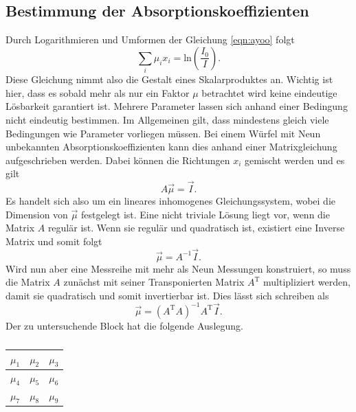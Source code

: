 \subsection{Bestimmung der Absorptionskoeffizienten}
Durch Logarithmieren und Umformen der Gleichung \eqref{eqn:ayoo} folgt
\begin{equation}
    \label{eqn:hierlol}
\sum_{i}^{} \mu_i x_i = \text{ln}\left(\frac{I_0}{I}\right).
\end{equation}
Diese Gleichung nimmt also die Gestalt eines Skalarproduktes an. Wichtig ist hier, dass es sobald mehr als nur ein Faktor $\mu$ betrachtet wird keine eindeutige Lösbarkeit garantiert ist. Mehrere Parameter lassen sich anhand einer Bedingung
nicht eindeutig bestimmen. Im Allgemeinen gilt, dass mindestens gleich viele Bedingungen wie Parameter vorliegen müssen. Bei einem Würfel mit Neun unbekannten Absorptionskoeffizienten kann dies anhand einer Matrixgleichung aufgeschrieben werden.
Dabei können die Richtungen $x_i$ gemischt werden und es gilt
\begin{equation*}
A \vec{\mu} = \vec{I}.
\end{equation*}
Es handelt sich also um ein lineares inhomogenes Gleichungssystem, wobei die Dimension von $\vec{\mu}$ festgelegt ist. Eine nicht triviale Lösung liegt vor, wenn die Matrix $A$ regulär ist. Wenn sie regulär und quadratisch ist, existiert
eine Inverse Matrix und somit folgt
\begin{equation*}
\vec{\mu} = A^{-1}\vec{I}.
\end{equation*}
Wird nun aber eine Messreihe mit mehr als Neun Messungen konstruiert, so muss die Matrix $A$ zunächst mit seiner Transponierten Matrix $A^{\text{T}}$ multipliziert werden, damit sie quadratisch und somit invertierbar ist. 
Dies lässt sich schreiben als 
\begin{equation*}
\vec{\mu} = (A^{\text{T}}A)^{-1} A^{\text{T}} \vec{I}.
\end{equation*}
Der zu untersuchende Block hat die folgende Auslegung.
\begin{table}
    \centering
    \caption*{} 
    \label{tab:3}
    \begin{tabular}{c | c | c}
        $\mu_1$ & $\mu_2$ & $\mu_3$ \\
        \midrule
        $\mu_4$ & $\mu_5$ & $\mu_6$  \\
        \midrule
        $\mu_7$ & $\mu_8$ & $\mu_9$  \\
    \end{tabular}
\end{table}
